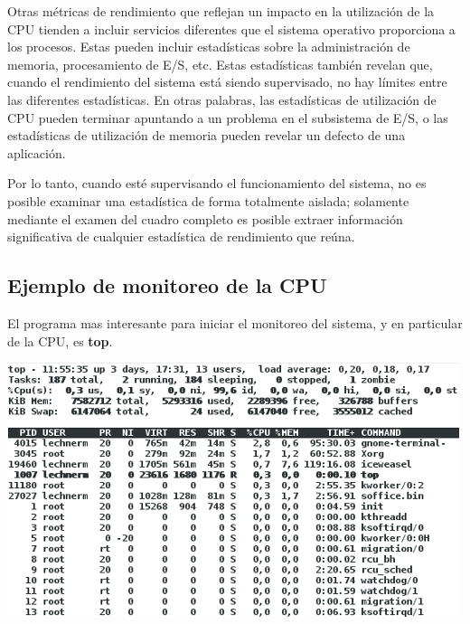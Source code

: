 \documentclass[12pt]{article}
\begin{document}
Otras métricas de rendimiento que reflejan un impacto en la utilización 
de la CPU tienden a incluir servicios diferentes que el sistema operativo 
proporciona a los procesos. Estas pueden incluir estadísticas sobre la 
administración de memoria, procesamiento de E/S, etc. Estas estadísticas 
también revelan que, cuando el rendimiento del sistema está siendo 
supervisado, no hay límites entre las diferentes estadísticas. En otras 
palabras, las estadísticas de utilización de CPU pueden terminar apuntando 
a un problema en el subsistema de E/S, o las estadísticas de utilización 
de memoria pueden revelar un defecto de una aplicación.

Por lo tanto, cuando esté supervisando el funcionamiento del sistema, no 
es posible examinar una estadística de forma totalmente aislada; solamente
mediante el examen del cuadro completo es posible extraer información 
significativa de cualquier estadística de rendimiento que reúna.

\subsection*{Ejemplo de monitoreo de la CPU}

El programa mas interesante para iniciar el monitoreo del sistema, y en 
particular de la CPU, es \textbf{top}.


\begin{center}
 \includegraphics{top.png}
\end{center}
\end{document}
